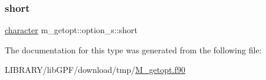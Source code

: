 \mbox{\label{structm__getopt_1_1option__s_a427aa0a11a8f872eed789f0dd6f54459}} 
\subsubsection{\texorpdfstring{short}{short}}
{\footnotesize\ttfamily \hyperlink{option__stopwatch_83_8txt_abd4b21fbbd175834027b5224bfe97e66}{character} m\+\_\+getopt\+::option\+\_\+s\+::short}



The documentation for this type was generated from the following file\+:\begin{DoxyCompactItemize}
\item 
L\+I\+B\+R\+A\+R\+Y/lib\+G\+P\+F/download/tmp/\hyperlink{M__getopt_8f90}{M\+\_\+getopt.\+f90}\end{DoxyCompactItemize}
